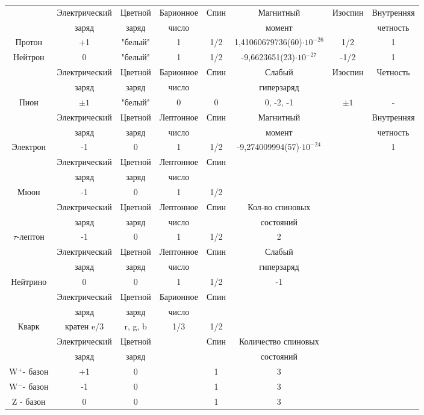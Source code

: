 \documentclass[a4paper,14pt]{article}
\begin{document}
\begin{scriptsize}
\begin{center}
\begin{tabular}{cccccccc}
\hline
& Электрический & Цветной & Барионное& Спин & Магнитный  & Изоспин & Внутренняя\\
& заряд &заряд& число & & момент  && четность\\
Протон & +1 &"белый"& 1 &  1/2 & 1,41060679736(60)$\cdot10^{-26}$  & 1/2& 1\\
Нейтрон & 0 &"белый"& 1 &  1/2 & -9,6623651(23)$\cdot10^{-27}$ & -1/2& 1\\
\hline
& Электрический &Цветной& Барионное& Спин & Слабый & Изоспин& Четность\\
& заряд &заряд& число & & гиперзаряд && \\
Пион &$\pm1$ & "белый"&0&0&0, -2, -1&$\pm1$& -
\\
\hline
& Электрический &Цветной& Лептонное & Спин & Магнитный && Внутренняя   \\
& заряд &заряд& число & & момент && четность\\
Электрон & -1 &0 & 1 & 1/2 & -9,274009994(57)$\cdot10^{-24}$ && 1
\\
\hline
& Электрический &Цветной& Лептонное & Спин &&& \\
& заряд & заряд & число &&&&  \\
Мюон & -1 &0& 1 & 1/2 &&&
\\
\hline
& Электрический &Цветной& Лептонное & Спин & Кол-во спиновых   \\
& заряд &заряд& число & & состояний \\
$\tau$-лептон & -1 &0& 1 & 1/2 & 2
\\
\hline
& Электрический &Цветной& Лептонное & Спин & Слабый  \\
& заряд &заряд& число & & гиперзаряд \\
Нейтрино & 0 & 0 & 1 & 1/2 & -1
\\
\hline
& Электрический &Цветной& Барионное & Спин  \\
& заряд &заряд& число & \\
Кварк & кратен e/3 & r, g, b & 1/3 & 1/2 
\\
\hline
& Электрический & Цветной && Спин & Количество спиновых  \\
& заряд & заряд &&& состояний\\
W$^+$- базон & +1& 0&& 1&3\\
W$^-$- базон& -1 &0 &&1&3\\
Z -  базон&0 &0 && 1&3\\

\end{tabular}
\end{center}
\end{scriptsize}
\end{document}

